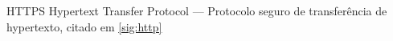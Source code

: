 \begin{siglas}
\item[HTTPS] Hypertext Transfer Protocol --- Protocolo seguro de
  transferência de hypertexto, citado em \ref{sig:http}
\end{siglas}
